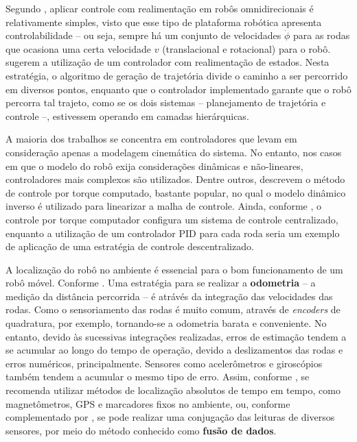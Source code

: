 Segundo \cite{lynch2017modern}, aplicar controle com realimentação em robôs omnidirecionais é relativamente simples, visto que esse tipo de plataforma robótica apresenta controlabilidade -- ou seja, sempre há um conjunto de velocidades \textbf{$\dot\phi$} para as rodas que ocasiona uma certa velocidade \textbf{$v$} (translacional e rotacional) para o robô. \cite{siegwart2011introduction} sugerem a utilização de um controlador com realimentação de estados. Nesta estratégia, o algoritmo de geração de trajetória divide o caminho a ser percorrido em diversos pontos, enquanto que o controlador implementado garante que o robô percorra tal trajeto, como se os dois sistemas -- planejamento de trajetória e controle --, estivessem operando em camadas hierárquicas.

A maioria dos trabalhos se concentra em controladores que levam em consideração apenas a modelagem cinemática do sistema. No entanto, nos casos em que o modelo do robô exija considerações dinâmicas e não-lineares, controladores mais complexos são utilizados. Dentre outros, \cite{siciliano2016springer} descrevem o método de controle por torque computado, bastante popular, no qual o modelo dinâmico inverso é utilizado para linearizar a malha de controle. Ainda, conforme \cite{indiveri2009swedish}, o controle por torque computador configura um sistema de controle centralizado, enquanto a utilização de um controlador PID para cada roda seria um exemplo de aplicação de uma estratégia de controle descentralizado.

A localização do robô no ambiente é essencial para o bom funcionamento de um robô móvel. Conforme \cite{lynch2017modern}. Uma estratégia para se realizar a \textbf{odometria} -- a medição da distância percorrida -- é atrávés da integração das velocidades das rodas. Como o sensoriamento das rodas é muito comum, através de \textit{encoders} de quadratura, por exemplo, tornando-se a odometria barata e conveniente. No entanto, devido às sucessivas integrações realizadas, erros de estimação tendem a se acumular ao longo do tempo de operação, devido a deslizamentos das rodas e erros numéricos, principalmente. Sensores como acelerômetros e giroscópios também tendem a acumular o mesmo tipo de erro. Assim, conforme \cite{siegwart2011introduction}, se recomenda utilizar métodos de localização absolutos de tempo em tempo, como magnetômetros, GPS e marcadores fixos no ambiente, ou, conforme complementado por \cite{lynch2017modern}, se pode realizar uma conjugação das leituras de diversos sensores, por meio do método conhecido como \textbf{fusão de dados}.

